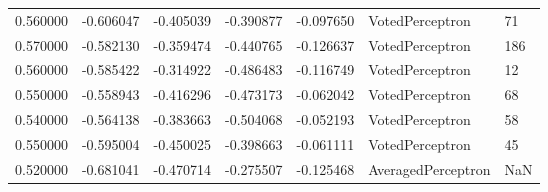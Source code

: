 \begin{tabular}{rrrrrll}
0.560000 & -0.606047 & -0.405039 & -0.390877 & -0.097650 & VotedPerceptron & 71 \\
0.570000 & -0.582130 & -0.359474 & -0.440765 & -0.126637 & VotedPerceptron & 186 \\
0.560000 & -0.585422 & -0.314922 & -0.486483 & -0.116749 & VotedPerceptron & 12 \\
0.550000 & -0.558943 & -0.416296 & -0.473173 & -0.062042 & VotedPerceptron & 68 \\
0.540000 & -0.564138 & -0.383663 & -0.504068 & -0.052193 & VotedPerceptron & 58 \\
0.550000 & -0.595004 & -0.450025 & -0.398663 & -0.061111 & VotedPerceptron & 45 \\
0.520000 & -0.681041 & -0.470714 & -0.275507 & -0.125468 & AveragedPerceptron & NaN \\
\bottomrule
\end{tabular}
